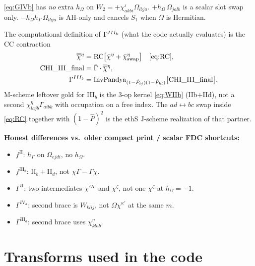 \documentclass[enabledeprecatedfontcommands]{scrartcl}
\newcommand{\MyRomanNum}[1]{%
  \ifcase#1\or I\or II\or III\or IV\or V\or VI\or VII\or VIII\or IX\or X\else #1\fi}
\begin{document}
\eqref{eq:GIVb} has \emph{no} extra $h_\Omega$ on $W_2=+\chi^\iota_{akbi}\Omega_{lbja}$.
$+h_\Omega\,\Omega_{jalb}$ is a scalar slot swap only.
$-h_\Omega h_\Gamma\,\Omega_{lbja}$ is AH-only and cancels $S_1$ when
$\Omega$ is Hermitian.

The computational definition of $\Gamma^{\MyRomanNum{3}_b}$ (what the code
actually evaluates) is the CC contraction
\begin{equation}\label{eq:GIIIb-CC}
\begin{aligned}
\overline{\overline\chi}{}^{\eta}
  &= \mathrm{RC}\bigl[\bar\chi^\eta+\bar\chi^\eta_{\mathrm{swap}}\bigr]
     \quad\text{\eqref{eq:RC}},\\
\mathrm{CHI\_III\_final}
  &= \bar\Gamma\cdot\overline{\overline\chi}{}^\eta,\\
\Gamma^{\MyRomanNum{3}_b}
  &= \mathrm{InvPandya}_{(1-\hat P_{ij})(1-\hat P_{kl})}
     \bigl[\mathrm{CHI\_III\_final}\bigr].
\end{aligned}
\end{equation}
M-scheme leftover gold for III$_b$ is the 3-op kernel \eqref{eq:WIIb}
(IIb$+$IId), not a second $\chi^\eta_{lajb}\Gamma_{aibk}$ with occupation
on a free index. The $ad\leftrightarrow bc$ swap inside \eqref{eq:RC}
together with $(1-\hat P)^2$ is the ethS J-scheme realization of that
partner.

\textbf{Honest differences vs.\ older compact print / scalar FDC shortcuts:}
\begin{itemize}
  \item $f^{\mathrm{II}}$: $h_\Gamma$ on $\Omega_{ejdi}$, no $h_\Omega$.
  \item $f^{\mathrm{III}_b}$: II$_b+$II$_d$, not $\chi\Gamma-\Gamma\chi$.
  \item $\Gamma^{\mathrm{II}}$: two intermediates $\chi^{\Omega\Gamma}$ and
    $\chi^\zeta$, not one $\chi^\zeta$ at $h_\Omega=-1$.
  \item $\Gamma^{\mathrm{IV}_a}$: second brace is $W_{klij}$, not
    $\Omega\chi^{\kappa'}$ at the same $m$.
  \item $\Gamma^{\mathrm{III}_a}$: second brace uses $\chi^{\eta}_{klab}$.
\end{itemize}

\section{Transforms used in the code}
\label{sec:transforms}
\end{document}
